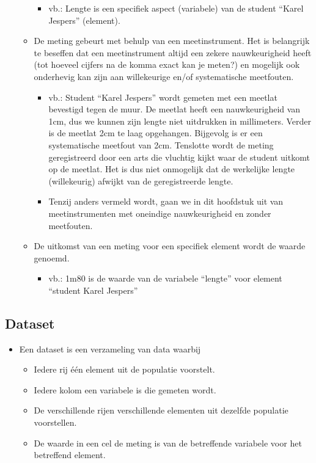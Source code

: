 \documentclass[]{tufte-book}
\providecommand{\tightlist}{%
  \setlength{\itemsep}{0pt}\setlength{\parskip}{0pt}}
\begin{document}
\begin{itemize}
\begin{itemize}
    \begin{itemize}
    \tightlist
    \item
      vb.: Lengte is een specifiek aspect (variabele) van de student ``Karel Jespers'' (element).
    \end{itemize}
  \item
    De meting gebeurt met behulp van een meetinstrument. Het is belangrijk te beseffen dat een meetinstrument altijd een zekere nauwkeurigheid heeft (tot hoeveel cijfers na de komma exact kan je meten?) en mogelijk ook onderhevig kan zijn aan willekeurige en/of systematische meetfouten.

    \begin{itemize}
    \tightlist
    \item
      vb.: Student ``Karel Jespers'' wordt gemeten met een meetlat bevestigd tegen de muur. De meetlat heeft een nauwkeurigheid van 1cm, dus we kunnen zijn lengte niet uitdrukken in millimeters. Verder is de meetlat 2cm te laag opgehangen. Bijgevolg is er een systematische meetfout van 2cm. Tenslotte wordt de meting geregistreerd door een arts die vluchtig kijkt waar de student uitkomt op de meetlat. Het is dus niet onmogelijk dat de werkelijke lengte (willekeurig) afwijkt van de geregistreerde lengte.
    \item
      Tenzij anders vermeld wordt, gaan we in dit hoofdstuk uit van meetinstrumenten met oneindige nauwkeurigheid en zonder meetfouten.
    \end{itemize}
  \item
    De uitkomst van een meting voor een specifiek element wordt de waarde genoemd.

    \begin{itemize}
    \tightlist
    \item
      vb.: 1m80 is de waarde van de variabele ``lengte'' voor element ``student Karel Jespers''
    \end{itemize}
  \end{itemize}
\end{itemize}

\hypertarget{dataset}{%
\subsection{Dataset}\label{dataset}}

\begin{itemize}
\tightlist
\item
  Een dataset is een verzameling van data waarbij

  \begin{itemize}
  \tightlist
  \item
    Iedere rij één element uit de populatie voorstelt.
  \item
    Iedere kolom een variabele is die gemeten wordt.
  \item
    De verschillende rijen verschillende elementen uit dezelfde populatie voorstellen.
  \item
    De waarde in een cel de meting is van de betreffende variabele voor het betreffend element.
  \end{itemize}
\end{itemize}
\end{document}
